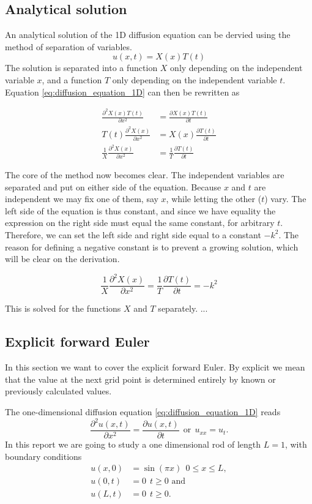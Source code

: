 \documentclass[12pt]{extarticle}
\begin{document}
\subsection*{Analytical solution}
An analytical solution of the 1D diffusion equation can be dervied using the method of separation of variables.
\[ u(x,t) = X(x)T(t) \]
The solution is separated into a function $X$ only depending on the independent variable $x$, and a function $T$ only depending on the independent variable $t$. Equation \ref{eq:diffusion_equation_1D} can then be rewritten as

\begin{align*}
	\frac{\partial^2 X(x)T(t)}{\partial x^2} &= \frac{\partial X(x)T(t)}{\partial t} \\
	T(t)\frac{\partial^2 X(x)}{\partial x^2} &= X(x)\frac{\partial T(t)}{\partial t} \\
	\frac{1}{X}\frac{\partial^2 X(x)}{\partial x^2} &= \frac{1}{T}\frac{\partial T(t)}{\partial t}
\end{align*}

The core of the method now becomes clear. The independent variables are separated and put on either side of the equation. Because $x$ and $t$ are independent we may fix one of them, say $x$, while letting the other ($t$) vary. The left side of the equation is thus constant, and since we have equality the expression on the right side must equal the same constant, for arbitrary $t$. Therefore, we can set the left side and right side equal to a constant $-k^2$. The reason for defining a negative constant is to prevent a growing solution, which will be clear on the derivation.

\[ \frac{1}{X}\frac{\partial^2 X(x)}{\partial x^2} = \frac{1}{T}\frac{\partial T(t)}{\partial t} = -k^2\]

This is solved for the functions $X$ and $T$ separately. ...

\subsection*{Explicit forward Euler}
In this section we want to cover the explicit forward Euler. By explicit we mean that the value at the next grid point is determined entirely by known or previously calculated values.

The one-dimensional diffusion equation \eqref{eq:diffusion_equation_1D} reads 
\begin{equation}
\frac{\partial^2u(x, t)}{\partial x^2} = \frac{\partial u(x,t)}{\partial t} \ \ \text{or} \ \ u_{xx} = u_t.
\end{equation}
In this report we are going to study a one dimensional rod of length $L=1$, with boundary conditions
\begin{align}
	u(x,0) &= \sin(\pi x) \ \ 0\leq x\leq L,\\
	u(0,t) &= 0 \ \ t\geq 0 \text{ and} \\
	u(L,t) &= 0 \ \ t\geq 0.
\end{align}
\end{document}
